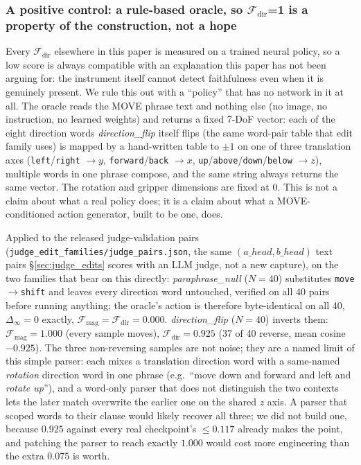 \subsubsection{A positive control: a rule-based oracle, so \texorpdfstring{$\mathcal{F}_{\text{dir}}$}{F\_dir}=1 is a property of the construction, not a hope}
\label{sec:oracle}

Every $\mathcal{F}_{\text{dir}}$ elsewhere in this paper is measured on a trained neural policy, so a low score is always compatible with an explanation this paper has not been arguing for: the instrument itself cannot detect faithfulness even when it is genuinely present. We rule this out with a ``policy'' that has no network in it at all. The oracle reads the MOVE phrase text and nothing else (no image, no instruction, no learned weights) and returns a fixed 7-DoF vector: each of the eight direction words \emph{direction\_flip} itself flips (the same word-pair table that edit family uses) is mapped by a hand-written table to $\pm 1$ on one of three translation axes (\texttt{left}/\texttt{right} $\to y$, \texttt{forward}/\texttt{back} $\to x$, \texttt{up}/\texttt{above}/\texttt{down}/\texttt{below} $\to z$), multiple words in one phrase compose, and the same string always returns the same vector. The rotation and gripper dimensions are fixed at $0$. This is not a claim about what a real policy does; it is a claim about what a MOVE-conditioned action generator, built to be one, does.

Applied to the released judge-validation pairs (\texttt{judge\_edit\_families/\allowbreak{}judge\_pairs.json}, the same $(a\_head, b\_head)$ text pairs \S\ref{sec:judge_edits} scores with an LLM judge, not a new capture), on the two families that bear on this directly: \emph{paraphrase\_null} ($N{=}40$) substitutes \texttt{move}$\to$\texttt{shift} and leaves every direction word untouched, verified on all 40 pairs before running anything; the oracle's action is therefore byte-identical on all 40, $\Delta_\infty = 0$ exactly, $\mathcal{F}_{\text{mag}} = \mathcal{F}_{\text{dir}} = 0.000$. \emph{direction\_flip} ($N{=}40$) inverts them: $\mathcal{F}_{\text{mag}} = 1.000$ (every sample moves), $\mathcal{F}_{\text{dir}} = 0.925$ (37 of 40 reverse, mean cosine $-0.925$). The three non-reversing samples are not noise; they are a named limit of this simple parser: each mixes a translation direction word with a same-named \emph{rotation} direction word in one phrase (e.g.\ ``move down and forward and left and \emph{rotate up}''), and a word-only parser that does not distinguish the two contexts lets the later match overwrite the earlier one on the shared $z$ axis. A parser that scoped words to their clause would likely recover all three; we did not build one, because $0.925$ against every real checkpoint's $\leq 0.117$ already makes the point, and patching the parser to reach exactly $1.000$ would cost more engineering than the extra $0.075$ is worth.


